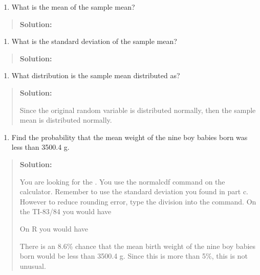\documentclass[]{book}
\providecommand{\tightlist}{%
  \setlength{\itemsep}{0pt}\setlength{\parskip}{0pt}}
\begin{document}
\begin{enumerate}
\def\labelenumi{\alph{enumi}.}
\setcounter{enumi}{1}
\tightlist
\item
  What is the mean of the sample mean?
\end{enumerate}

\begin{quote}
\textbf{Solution:}
\end{quote}

\begin{enumerate}
\def\labelenumi{\alph{enumi}.}
\setcounter{enumi}{2}
\tightlist
\item
  What is the standard deviation of the sample mean?
\end{enumerate}

\begin{quote}
\textbf{Solution:}
\end{quote}

\begin{enumerate}
\def\labelenumi{\alph{enumi}.}
\setcounter{enumi}{3}
\tightlist
\item
  What distribution is the sample mean distributed as?
\end{enumerate}

\begin{quote}
\textbf{Solution:}

Since the original random variable is distributed normally, then the
sample mean is distributed normally.
\end{quote}

\begin{enumerate}
\def\labelenumi{\alph{enumi}.}
\setcounter{enumi}{4}
\tightlist
\item
  Find the probability that the mean weight of the nine boy babies
  born was less than 3500.4 g.
\end{enumerate}

\begin{quote}
\textbf{Solution:}

You are looking for the . You use the normalcdf command on the
calculator. Remember to use the standard deviation you found in part
c. However to reduce rounding error, type the division into the
command. On the TI-83/84 you would have

On R you would have

There is an 8.6\% chance that the mean birth weight of the nine boy
babies born would be less than 3500.4 g. Since this is more than 5\%,
this is not unusual.
\end{quote}
\end{document}

